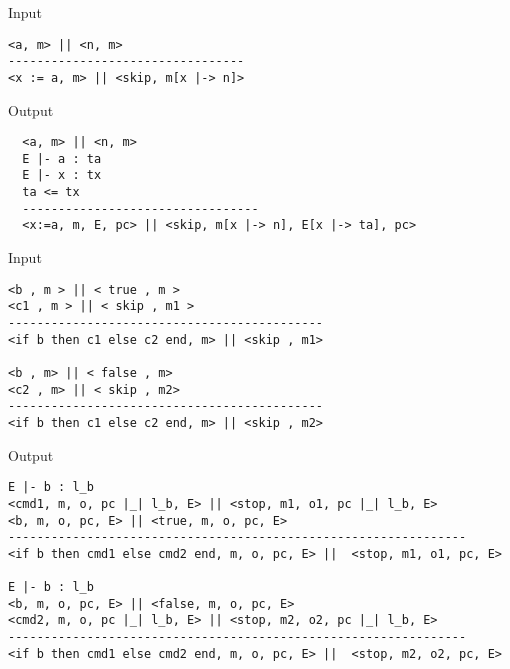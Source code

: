 \documentclass[final]{beamer}
\newlength{\twocolwid}
\begin{document}
\begin{frame}[fragile]
\begin{columns}[t]
\begin{column}{\twocolwid}
\noindent
\begin{minipage}[t]{0.48\linewidth}
\begin{alertblock}{Input}
\begin{lstlisting}
<a, m> || <n, m>
---------------------------------
<x := a, m> || <skip, m[x |-> n]>\end{lstlisting}        
\end{alertblock}
\end{minipage}
\hfill%
\begin{minipage}[t]{0.48\linewidth}
\begin{alertblock}{Output}
\begin{lstlisting}
  <a, m> || <n, m>
  E |- a : ta
  E |- x : tx
  ta <= tx
  ---------------------------------
  <x:=a, m, E, pc> || <skip, m[x |-> n], E[x |-> ta], pc>    
\end{lstlisting}
\end{alertblock}
\end{minipage}



\noindent
\begin{minipage}[t]{0.48\linewidth}
\begin{alertblock}{Input}
\begin{lstlisting}[basicstyle=\small]
<b , m > || < true , m >
<c1 , m > || < skip , m1 >
--------------------------------------------
<if b then c1 else c2 end, m> || <skip , m1>

<b , m> || < false , m>
<c2 , m> || < skip , m2>
--------------------------------------------
<if b then c1 else c2 end, m> || <skip , m2>
\end{lstlisting}        
\end{alertblock}
\end{minipage}
\hfill%
\begin{minipage}[t]{0.48\linewidth}
\begin{alertblock}{Output}
\begin{lstlisting}
E |- b : l_b
<cmd1, m, o, pc |_| l_b, E> || <stop, m1, o1, pc |_| l_b, E>
<b, m, o, pc, E> || <true, m, o, pc, E>
----------------------------------------------------------------
<if b then cmd1 else cmd2 end, m, o, pc, E> ||  <stop, m1, o1, pc, E>

E |- b : l_b
<b, m, o, pc, E> || <false, m, o, pc, E>
<cmd2, m, o, pc |_| l_b, E> || <stop, m2, o2, pc |_| l_b, E>
----------------------------------------------------------------
<if b then cmd1 else cmd2 end, m, o, pc, E> ||  <stop, m2, o2, pc, E>
\end{lstlisting}
\end{alertblock}
\end{minipage}


\end{column}
\end{columns}
\end{frame}
\end{document}
